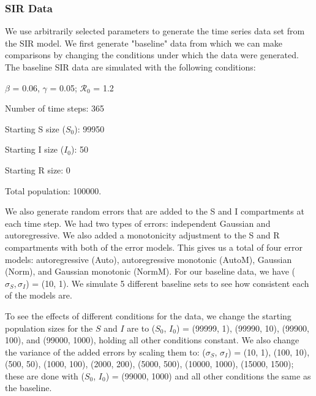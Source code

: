 \documentclass[12pt]{article}
\newcommand{\rr}{\ensuremath{\mathcal{R}_0}}
\begin{document}








\subsubsection{SIR Data}
We use arbitrarily selected parameters to generate the time series data set from the SIR model. We first generate "baseline" data from which we can make comparisons by changing the  conditions under which the data were generated. The baseline SIR data are simulated with the following conditions:

\begin{center}
	
	$\beta$ = 0.06, $\gamma$ = 0.05; $\rr$ = 1.2
	
	Number of time steps: 365
	
	Starting S size ($S_0$): 99950
	
	Starting I size ($I_0$): 50
	
	Starting R size: 0
	
	Total population: 100000.
	
\end{center}

We also generate random errors that are added to the S and I compartments at each time step. We had two types of errors: independent Gaussian and autoregressive. We also added a monotonicity adjustment to the S and R compartments with both of the error models. This gives us a total of four error models: autoregressive (Auto), autoregressive monotonic (AutoM), Gaussian (Norm), and Gaussian monotonic (NormM). For our baseline data, we have ($\sigma_S, \sigma_I$) = (10, 1). We simulate 5 different baseline sets to see how consistent each of the models are.

To see the effects of different conditions for the data, we change the starting population sizes for the $S$ and $I$ are to ($S_0$, $I_0$) =  (99999, 1), (99990, 10), (99900, 100), and (99000, 1000), holding all other conditions constant. We also change the variance of the added errors by scaling them to: ($\sigma_S$, $\sigma_I$) = (10, 1), (100, 10), (500, 50), (1000, 100), (2000, 200), (5000, 500), (10000, 1000), (15000, 1500); these are done with ($S_0$, $I_0$) = (99000, 1000) and all other conditions the same as the baseline.
\end{document}
